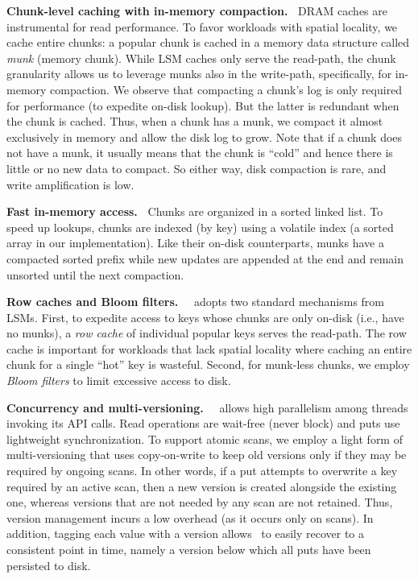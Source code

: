 {\bf Chunk-level caching with in-memory compaction.\ }
DRAM caches are instrumental for read performance. 
To favor workloads with spatial locality, we cache entire chunks:
a popular chunk is cached in a  memory data structure called \emph{munk} (memory chunk).
While LSM caches  only serve the read-path, the chunk granularity allows us to 
leverage munks also in the write-path, specifically, for in-memory compaction.  
We observe that 
compacting a chunk's log is only required for performance (to expedite on-disk lookup). But the latter is redundant when the chunk is cached. Thus, when 
a chunk has a munk, we compact it almost exclusively in memory and allow the disk log to grow. 
Note that if a chunk does not have a munk, it usually means that the chunk is ``cold'' 
and hence there is little or no new data to compact. So either way, disk compaction is rare, and write amplification is low.

{\bf Fast in-memory access.\ }
Chunks are organized in a sorted linked list. To speed up lookups, chunks are indexed (by key) using a volatile index (a sorted array in our implementation).  
Like their on-disk counterparts, munks have a compacted sorted prefix while new updates are appended at the end and remain unsorted until the next compaction. 
 
 {\bf Row caches and Bloom filters.\ }
 \sys\ adopts two standard mechanisms from LSMs. First, to expedite access to  keys whose chunks are only on-disk  (i.e., have no munks), 
a \emph{row cache} of individual popular keys serves the read-path. The row cache is important for workloads that lack
spatial locality where caching an entire chunk for a single ``hot'' key is wasteful. 
Second, for munk-less chunks, we employ \emph{Bloom filters} to limit excessive access to disk. 

{\bf Concurrency and multi-versioning.\ }
 \sys\ allows high parallelism among threads invoking its API calls. 
 Read operations are wait-free (never block) and puts use lightweight synchronization. 
 To support atomic scans, we  employ a light form of multi-versioning that uses 
copy-on-write to keep old versions only if they may be required by ongoing scans. 
In other words, if a put attempts to overwrite a key required by an active scan, then a new version is created alongside the 
existing one, whereas versions that are not needed by any scan are not retained. 
Thus, version management incurs a low overhead (as it occurs only on scans). 
In addition, tagging each value with a version allows \sys\ to easily recover to a consistent point in time, namely a version below which all puts have been persisted to disk.


